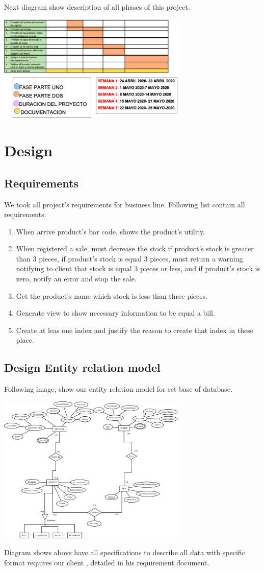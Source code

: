 \documentclass{article}
\begin{document}
Next diagram show description of all phases of this project.
\begin{center}
\includegraphics[width=9cm]{crono3}
\end{center}
\section{Design}
\subsection{Requirements}
We took all project's requirements for business line. Following list contain all requirements.
\begin{enumerate}
\item When arrive product's bar code, shows the product's utility.
\item When registered a sale, must decrease the stock if product's stock is greater than 3 pieces, if product's stock is equal 3 pieces, must return a warning notifying to client that stock is equal 3 pieces or less, and if product's stock is zero, notify an error and stop the sale.
\item  Get the product's name which stock is less than three pieces.
\item Generate view to show necessary information to be equal a bill.
\item Create at leas one index and justify the reason to create that index in these place.
\end{enumerate}
\subsection{Design Entity relation model}
Following image, show our entity relation model for set base of database.
\begin{center}
\includegraphics[width=9cm]{OfficeSaleSystemDB_MER}
\end{center}
Diagram shows above have all specifications to describe all data with specific format requires our client , detailed in his requirement document. 
\end{document}
